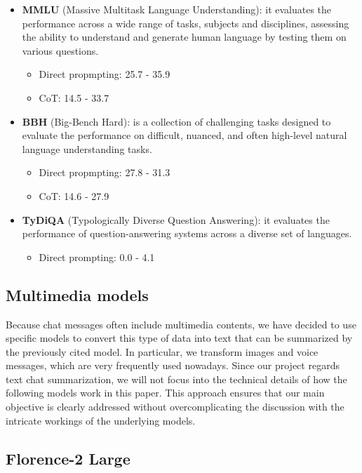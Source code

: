 \documentclass[10pt,twocolumn,letterpaper]{article}
\begin{document}
\begin{itemize}
    \item \textbf{MMLU} (Massive Multitask Language Understanding): it evaluates the performance across a wide range of tasks, subjects and disciplines, assessing the ability to understand and generate human language by testing them on various questions.
    \begin{itemize}
        \item Direct propmpting: 25.7 - 35.9
        \item CoT: 14.5 - 33.7
    \end{itemize}
    \item \textbf{BBH} (Big-Bench Hard): is a collection of challenging tasks designed to evaluate the performance on difficult, nuanced, and often high-level natural language understanding tasks. 
    \begin{itemize}
        \item Direct propmpting: 27.8 - 31.3
        \item CoT: 14.6 - 27.9
    \end{itemize}
    \item \textbf{TyDiQA} (Typologically Diverse Question Answering): it evaluates the performance of question-answering systems across a diverse set of languages.
    \begin{itemize}
        \item Direct prompting: 0.0 - 4.1
    \end{itemize}
\end{itemize}

\subsection{Multimedia models}

Because chat messages often include multimedia contents, we have decided to use specific models to convert this type of data into text that can be summarized by the previously cited model. In particular, we transform images and voice messages, which are very frequently used nowadays. 
Since our project regards text chat summarization, we will not focus into the technical details of how the following models work in this paper. This approach ensures that our main objective is clearly addressed without overcomplicating the discussion with the intricate workings of the underlying models.

\subsection{Florence-2 Large}
\end{document}
